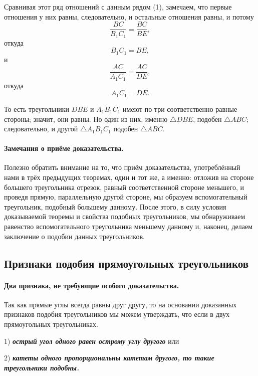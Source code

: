 \documentclass[twoside]{book}
\begin{document}
Сравнивая этот ряд отношений с данным рядом (1), замечаем, что первые отношения у них равны, следовательно, и остальные отношения равны, и потому
\[\frac{BC}{B_1C_1}=\frac{BC}{BE},\]
откуда
\[B_1C_1=BE,\]
и
\[\frac{AC}{A_1C_1}=\frac{AC}{DE},\]
откуда
\[A_1C_1=DE.\]

То есть треугольники $DBE$ и $A_1B_1C_1$ имеют по три соответственно равные стороны;
значит, они равны.
Но один из них, именно $\triangle DBE$, подобен $\triangle ABC$;
следовательно, и другой $\triangle A_1B_1C_1$ подобен $\triangle ABC$.

\paragraph{Замечания о приёме доказательства.}\label{1938/162}
Полезно обратить внимание на то, что приём доказательства, употреблённый нами в трёх предыдущих теоремах, один и тот же, а именно:
отложив на стороне большего треугольника отрезок, равный соответственной стороне меньшего, и проведя прямую, параллельную другой стороне, мы образуем вспомогательный треугольник, подобный большему данному.
После этого, в силу условия доказываемой теоремы и свойства подобных треугольников, мы обнаруживаем равенство вспомогательного треугольника меньшему данному и, наконец, делаем заключение о подобии данных треугольников.

\renewcommand{\bottomtitlespace}{.15\textheight}%

\subsection*{Признаки подобия прямоугольных треугольников}

\renewcommand{\bottomtitlespace}{.1\textheight}%

\paragraph{Два признака, не требующие особого доказательства.}\label{1938/163}

Так как прямые углы всегда равны друг другу, то на основании доказанных признаков подобия треугольников мы можем утверждать, что если в двух прямоугольных треугольниках.

1) \textbf{\emph{острый угол одного равен острому углу другого}} или

2) \textbf{\emph{катеты одного пропорциональны катетам другого, то такие треугольники подобны.}}
\end{document}
